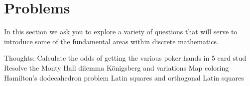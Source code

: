 \section{Problems}
In this section we ask you to explore a variety of questions that will
serve to introduce some of the fundamental areas within discrete mathematics. 

Thoughts:
Calculate the odds of getting the various poker hands in 5 card stud
Resolve the Monty Hall dilemma
K\"{o}nigsberg and variations
Map coloring
Hamilton's dodecahedron problem
Latin squares and orthogonal Latin squares
